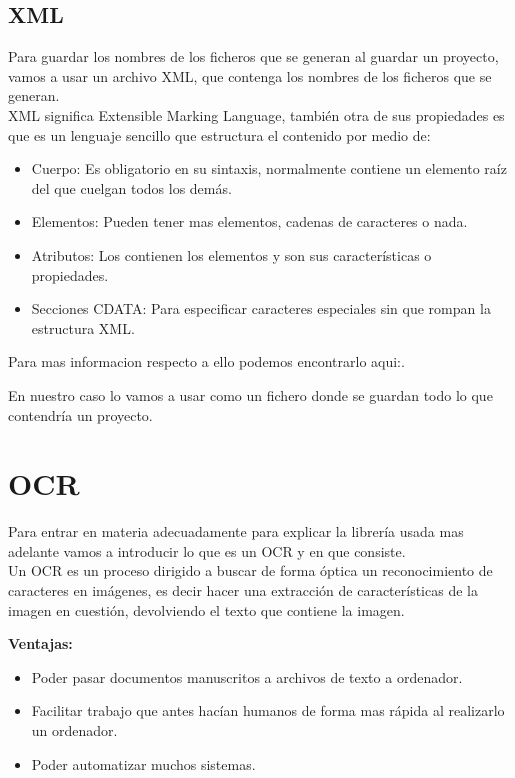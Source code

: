 \subsection{XML}
Para guardar los nombres de los ficheros que se generan al guardar un proyecto, vamos a usar un archivo XML, que contenga los nombres de los ficheros que se generan.\\
XML significa Extensible Marking Language, también otra de sus propiedades es que es un lenguaje sencillo que estructura el contenido por medio de:
\begin{itemize}
\item Cuerpo: Es obligatorio en su sintaxis, normalmente contiene un elemento raíz del que cuelgan todos los demás.
\item Elementos: Pueden tener mas elementos, cadenas de caracteres o nada.
\item Atributos: Los contienen los elementos y son sus características o propiedades.
\item Secciones CDATA: Para especificar caracteres especiales sin que rompan la estructura XML.
\end{itemize}
 
Para mas informacion respecto a ello podemos encontrarlo aqui:\cite{Wiki:xml}.

En nuestro caso lo vamos a usar como un fichero donde se guardan todo lo que contendría un proyecto.

\section{OCR}
Para entrar en materia adecuadamente para explicar la librería usada mas adelante vamos a introducir lo que es un OCR\cite{OCR} y en que consiste.\\
Un OCR es un proceso dirigido a buscar de forma óptica un reconocimiento de caracteres en imágenes, es decir hacer una extracción de características de la imagen en cuestión, devolviendo el texto que contiene la imagen.

\textbf{Ventajas:}
\begin{itemize}
\item Poder pasar documentos manuscritos a archivos de texto a ordenador.
\item Facilitar trabajo que antes hacían humanos de forma mas rápida al realizarlo un ordenador.
\item Poder automatizar muchos sistemas.
\end{itemize}

